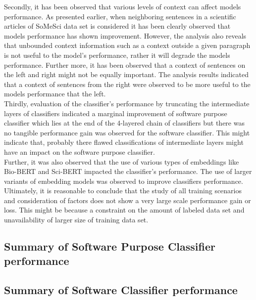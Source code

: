 Secondly, it has been observed that various levels of context can affect models performance. As presented earlier, when neighboring sentences in a scientific articles of SoMeSci data set is considered it has been clearly observed that models performance has shown improvement. However, the analysis also reveals that unbounded context information such as a context outside a given paragraph is not useful to the model’s performance, rather it will degrade the models performance. Further more, it has been observed that a context of sentences on the left and right might not be equally important. The analysis results indicated that a context of sentences from the right were observed to be more useful to the models performance that the left. \\

Thirdly, evaluation of the classifier’s performance by truncating the intermediate layers of classifiers indicated a marginal improvement of software purpose classifier which lies at the end of the 4-layered chain of classifiers but there was no tangible performance gain was observed for the software classifier. This might indicate that, probably there flawed classifications of intermediate layers might have an impact on the software purpose classifier. \\

Further, it was also observed that the use of various types of embeddings like Bio-BERT and Sci-BERT impacted the classifier’s performance. The use of larger variants of embedding models was observed to improve classifiers performance. \\

Ultimately, it is reasonable to conclude that the study of all training scenarios and consideration of factors does not show a very large scale performance gain or loss. This might be because a constraint on the amount of labeled data set and unavailability of larger size of training data set. 



\subsection{Summary of Software Purpose Classifier performance}
\label{sec:chapter06:summary_softPurpose}

\subsection{Summary of Software Classifier performance}
\label{sec:chapter06:summary_soft}



















